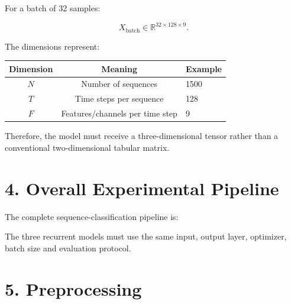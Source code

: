 \documentclass[10pt]{article}
\begin{document}
For a batch of 32 samples:

\[
X_{\mathrm{batch}}\in\mathbb{R}^{32\times128\times9}.
\]

The dimensions represent:

\begin{center}
\begin{tabular}{|c|c|l|}
\hline
Dimension & Meaning & Example\\
\hline
$N$ & Number of sequences & 1500\\
$T$ & Time steps per sequence & 128\\
$F$ & Features/channels per time step & 9\\
\hline
\end{tabular}
\end{center}

Therefore, the model must receive a three-dimensional tensor rather than a
conventional two-dimensional tabular matrix.

\section*{4. Overall Experimental Pipeline}

The complete sequence-classification pipeline is:

\begin{center}
\end{center}

The three recurrent models must use the same input, output layer, optimizer,
batch size and evaluation protocol.

\section*{5. Preprocessing}
\end{document}
